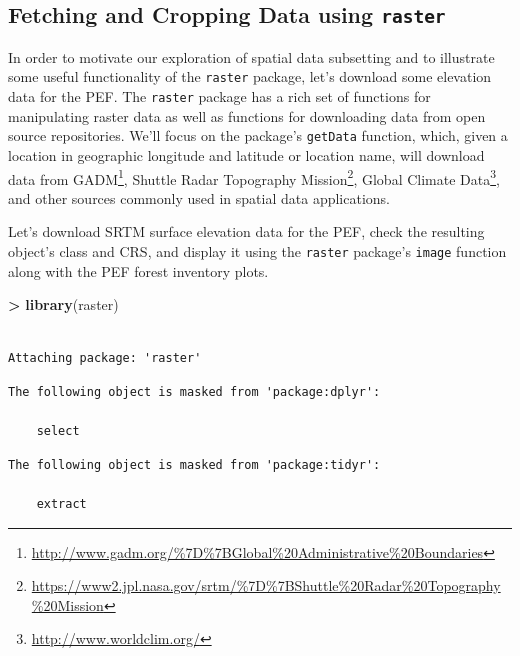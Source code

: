 \documentclass[]{krantz}
\makeatletter
\newenvironment{Shaded}{\begin{snugshade}}{\end{snugshade}}
\newcommand{\KeywordTok}[1]{\textcolor[rgb]{0.27,0.27,0.27}{\textbf{#1}}}
\newcommand{\NormalTok}[1]{#1}
\newcommand{\OperatorTok}[1]{\textcolor[rgb]{0.43,0.43,0.43}{\textbf{#1}}}
\newcommand{\StringTok}[1]{\textcolor[rgb]{0.5,0.5,0.5}{#1}}
\renewcommand{\href}[2]{#2\footnote{\url{#1}}}
\newenvironment{kframe}{%
\medskip{}
\setlength{\fboxsep}{.8em}
 \def\at@end@of@kframe{}%
 \ifinner\ifhmode%
  \def\at@end@of@kframe{\end{minipage}}%
  \begin{minipage}{\columnwidth}%
 \fi\fi%
 \def\FrameCommand##1{\hskip\@totalleftmargin \hskip-\fboxsep
 \colorbox{shadecolor}{##1}\hskip-\fboxsep
     \hskip-\linewidth \hskip-\@totalleftmargin \hskip\columnwidth}%
 \MakeFramed {\advance\hsize-\width
   \@totalleftmargin\z@ \linewidth\hsize
   \@setminipage}}%
 {\par\unskip\endMakeFramed%
 \at@end@of@kframe}
\renewenvironment{Shaded}{\begin{kframe}}{\end{kframe}}
\makeatother
\begin{document}
\hypertarget{fetching-and-cropping-data-using-raster}{%
\subsection{\texorpdfstring{Fetching and Cropping Data using \texttt{raster}}{Fetching and Cropping Data using raster}}\label{fetching-and-cropping-data-using-raster}}

In order to motivate our exploration of spatial data subsetting and to illustrate some useful functionality of the \texttt{raster} package, let's download some elevation data for the PEF. The \texttt{raster} package has a rich set of functions for manipulating raster data as well as functions for downloading data from open source repositories. We'll focus on the package's \texttt{getData} function, which, given a location in geographic longitude and latitude or location name, will download data from \href{http://www.gadm.org/\%7D\%7BGlobal\%20Administrative\%20Boundaries}{GADM}, \href{https://www2.jpl.nasa.gov/srtm/\%7D\%7BShuttle\%20Radar\%20Topography\%20Mission}{Shuttle Radar Topography Mission}, \href{http://www.worldclim.org/}{Global Climate Data}, and other sources commonly used in spatial data applications.

Let's download SRTM surface elevation data for the PEF, check the resulting object's class and CRS, and display it using the \texttt{raster} package's \texttt{image} function along with the PEF forest inventory plots.

\begin{Shaded}
\begin{Highlighting}[]
\OperatorTok{>}\StringTok{ }\KeywordTok{library}\NormalTok{(raster)}
\end{Highlighting}
\end{Shaded}

\begin{verbatim}

Attaching package: 'raster'
\end{verbatim}

\begin{verbatim}
The following object is masked from 'package:dplyr':

    select
\end{verbatim}

\begin{verbatim}
The following object is masked from 'package:tidyr':

    extract
\end{verbatim}
\end{document}
